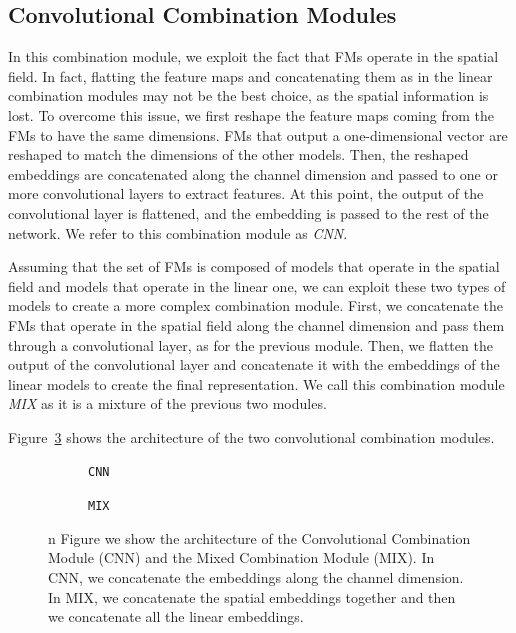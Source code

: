\subsection{Convolutional Combination Modules}
\label{subsec:convolutional_combination}
In this combination module, we exploit the fact that FMs operate in the spatial field.
In fact, flatting the feature maps and concatenating them as in the linear combination modules may not be the best choice, as the spatial information is lost.
To overcome this issue, we first reshape the feature maps coming from the FMs to have the same dimensions.
FMs that output a one-dimensional vector are reshaped to match the dimensions of the other models.
Then, the reshaped embeddings are concatenated along the channel dimension and passed to one or more convolutional layers to extract features.
At this point, the output of the convolutional layer is flattened, and the embedding is passed to the rest of the network.
We refer to this combination module as \textit{CNN}.


Assuming that the set of FMs is composed of models that operate in the spatial field and models that operate in the linear one, we can exploit these two types of models to create a more complex combination module.
First, we concatenate the FMs that operate in the spatial field along the channel dimension and pass them through a convolutional layer, as for the previous module.
Then, we flatten the output of the convolutional layer and concatenate it with the embeddings of the linear models to create the final representation.
We call this combination module \textit{MIX} as it is a mixture of the previous two modules.

Figure~\ref{fig:conv_combination} shows the architecture of the two convolutional combination modules.

\begin{figure}[ht]
    \centering
    \begin{subfigure}[b]{0.47\textwidth}
        \centering
        \fbox{\rule[-.5cm]{0cm}{4cm} \rule[-.5cm]{4cm}{0cm}}
        \caption{\texttt{CNN}}
        \label{fig:cnn}
    \end{subfigure}
    \hfill
    \begin{subfigure}[b]{0.47\textwidth}
        \centering
        \fbox{\rule[-.5cm]{0cm}{4cm} \rule[-.5cm]{4cm}{0cm}}
        \caption{\texttt{MIX}}
        \label{fig:mix}
    \end{subfigure}

    \caption{n Figure we show the architecture of the Convolutional Combination Module (CNN) and the Mixed Combination Module (MIX). In CNN, we concatenate the embeddings along the channel dimension. In MIX, we concatenate the spatial embeddings together and then we concatenate all the linear embeddings.}
    \label{fig:conv_combination}
\end{figure}

